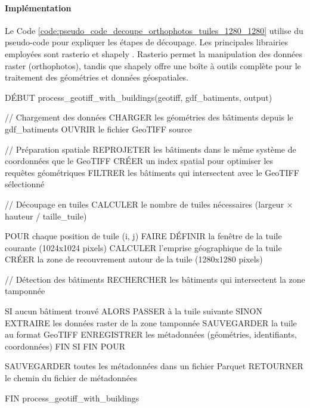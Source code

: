 \paragraph{Implémentation}
Le Code \ref{code:pseudo_code_decoupe_orthophotos_tuiles_1280_1280} utilise du pseudo-code pour expliquer les étapes de découpage. Les principales librairies employées sont rasterio \cite{noauthor_rasterio_nodate} et shapely \cite{noauthor_shapely_nodate}. Rasterio permet la manipulation des données raster (orthophotos), tandis que shapely offre une boîte à outils complète pour le traitement des géométries et données géospatiales.
\vspace{0.35cm}
\begin{textcode}
DÉBUT process_geotiff_with_buildings(geotiff, gdf_batiments, output)
    
    // Chargement des données
    CHARGER les géométries des bâtiments depuis le gdf_batiments
    OUVRIR le fichier GeoTIFF source
    
    // Préparation spatiale
    REPROJETER les bâtiments dans le même système de coordonnées que le GeoTIFF
    CRÉER un index spatial pour optimiser les requêtes géométriques
    FILTRER les bâtiments qui intersectent avec le GeoTIFF sélectionné
    
    // Découpage en tuiles
    CALCULER le nombre de tuiles nécessaires (largeur × hauteur / taille_tuile)
    
    POUR chaque position de tuile (i, j) FAIRE
        DÉFINIR la fenêtre de la tuile courante (1024x1024 pixels)
        CALCULER l'emprise géographique de la tuile
        CRÉER la zone de recouvrement autour de la tuile (1280x1280 pixels)
        
        // Détection des bâtiments
        RECHERCHER les bâtiments qui intersectent la zone tamponnée
        
        SI aucun bâtiment trouvé ALORS
            PASSER à la tuile suivante
        SINON
            EXTRAIRE les données raster de la zone tamponnée
            SAUVEGARDER la tuile au format GeoTIFF
            ENREGISTRER les métadonnées (géométries, identifiants, coordonnées)
        FIN SI
    FIN POUR
    
    SAUVEGARDER toutes les métadonnées dans un fichier Parquet
    RETOURNER le chemin du fichier de métadonnées
    
FIN process_geotiff_with_buildings
\end{textcode}
\label{code:pseudo_code_decoupe_orthophotos_tuiles_1280_1280}

